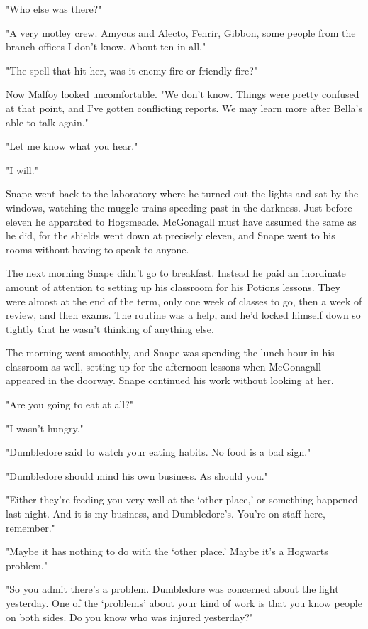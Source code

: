 \documentclass[a4paper,11pt]{article}
\begin{document}
"Who else was there?"

"A very motley crew. Amycus and Alecto, Fenrir, Gibbon, some people from the branch offices I don't know. About ten in all."

"The spell that hit her, was it enemy fire or friendly fire?"

Now Malfoy looked uncomfortable. "We don't know. Things were pretty confused at that point, and I've gotten conflicting reports. We may learn more after Bella's able to talk again."

"Let me know what you hear."

"I will."

Snape went back to the laboratory where he turned out the lights and sat by the windows, watching the muggle trains speeding past in the darkness. Just before eleven he apparated to Hogsmeade. McGonagall must have assumed the same as he did, for the shields went down at precisely eleven, and Snape went to his rooms without having to speak to anyone.

The next morning Snape didn't go to breakfast. Instead he paid an inordinate amount of attention to setting up his classroom for his Potions lessons. They were almost at the end of the term, only one week of classes to go, then a week of review, and then exams. The routine was a help, and he'd locked himself down so tightly that he wasn't thinking of anything else.

The morning went smoothly, and Snape was spending the lunch hour in his classroom as well, setting up for the afternoon lessons when McGonagall appeared in the doorway. Snape continued his work without looking at her.

"Are you going to eat at all?"

"I wasn't hungry."

"Dumbledore said to watch your eating habits. No food is a bad sign."

"Dumbledore should mind his own business. As should you."

"Either they're feeding you very well at the `other place,' or something happened last night. And it is my business, and Dumbledore's. You're on staff here, remember."

"Maybe it has nothing to do with the `other place.' Maybe it's a Hogwarts problem."

"So you admit there's a problem. Dumbledore was concerned about the fight yesterday. One of the `problems' about your kind of work is that you know people on both sides. Do you know who was injured yesterday?"
\end{document}
